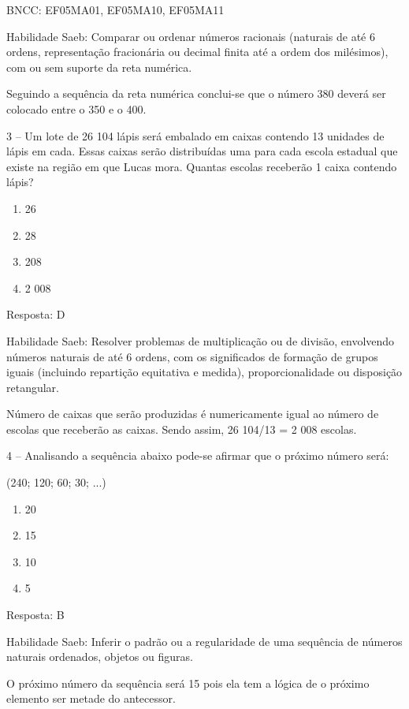 BNCC: EF05MA01, EF05MA10, EF05MA11

Habilidade Saeb: Comparar ou ordenar números racionais (naturais de até
6 ordens, representação fracionária ou decimal finita até a ordem dos
milésimos), com ou sem suporte da reta numérica.

Seguindo a sequência da reta numérica conclui-se que o número 380 deverá
ser colocado entre o 350 e o 400.

3 -- Um lote de 26 104 lápis será embalado em caixas contendo 13
unidades de lápis em cada. Essas caixas serão distribuídas uma para cada
escola estadual que existe na região em que Lucas mora. Quantas escolas
receberão 1 caixa contendo lápis?

\begin{enumerate}
\def\labelenumi{\alph{enumi})}
\item
  26
\item
  28
\item
  208
\item
  2 008
\end{enumerate}

Resposta: D

Habilidade Saeb: Resolver problemas de multiplicação ou de divisão,
envolvendo números naturais de até 6 ordens, com os significados de
formação de grupos iguais (incluindo repartição equitativa e medida),
proporcionalidade ou disposição retangular.

Número de caixas que serão produzidas é numericamente igual ao número de
escolas que receberão as caixas. Sendo assim, 26 104/13 = 2 008 escolas.

4 -- Analisando a sequência abaixo pode-se afirmar que o próximo número
será:

(240; 120; 60; 30; ...)

\begin{enumerate}
\def\labelenumi{\alph{enumi})}
\item
  20
\item
  15
\item
  10
\item
  5
\end{enumerate}

Resposta: B

Habilidade Saeb: Inferir o padrão ou a regularidade de uma sequência de
números naturais ordenados, objetos ou figuras.

O próximo número da sequência será 15 pois ela tem a lógica de o próximo
elemento ser metade do antecessor.

